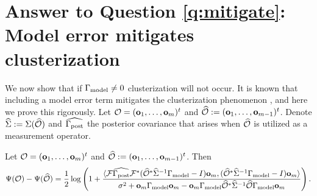 \section{Answer to Question \ref{q:mitigate}: Model error mitigates clusterization}\label{section:non vanishing}
We now show that if $\Gamma_{\textup{model}} \neq 0$ clusterization will not occur. It
is known that including a model error term mitigates the
clusterization phenomenon \cite{Ucinski05}, and here we prove this
rigorously. Let $\mathcal{O} = (\mathbf{o}_1,\dots,\mathbf{o}_m)^t$ and $\widehat{\mathcal{O}} :=
(\mathbf{o}_1,\dots,\mathbf{o}_{m-1})^t$. Denote $\widehat{\Sigma} := \Sigma (\widehat{\mathcal{O}})$ and
$\widehat{\Gamma_{\textup{post}}}$ the posterior covariance that arises when $\widehat{\mathcal{O}}$ is
utilized as a measurement operator.

\begin{proposition}\label{prop:design increase}
  Let $\mathcal{O} = (\mathbf{o}_1,\dots,\mathbf{o}_m)^t$ and $\widehat{\mathcal{O}} :=
  (\mathbf{o}_1,\dots,\mathbf{o}_{m-1})^t$. Then
  \begin{equation}\label{eq:conclusion}
    \Psi( \mathcal{O} ) - \Psi (\widehat{\mathcal{O}} ) =
    \frac12 \log \left ( 1 + \frac{
      \langle \mathcal{F} \widehat{\Gamma_{\textup{post}}} \mathcal{F}^* (\widehat{\mathcal{O}}^* \widehat{\Sigma}^{-1} \Gamma_{\textup{model}} - I ) \mathbf{o}_m,
      (\widehat{\mathcal{O}}^* \widehat{\Sigma}^{-1} \Gamma_{\textup{model}} - I ) \mathbf{o}_m \rangle
    }{
      \sigma^2 + \mathbf{o}_m \Gamma_{\textup{model}} \mathbf{o}_m - \mathbf{o}_m \Gamma_{\textup{model}} \widehat{\mathcal{O}}^* \widehat{\Sigma}^{-1} \widehat{\mathcal{O}} \Gamma_{\textup{model}} \mathbf{o}_m 
    }       
    \right ).
  \end{equation}
\end{proposition}

